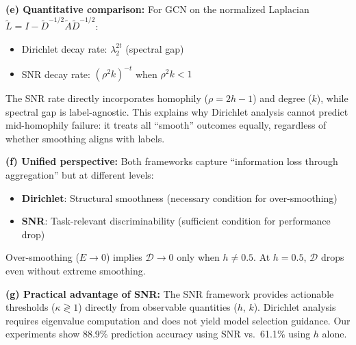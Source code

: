 \begin{remark}
\textbf{(e) Quantitative comparison:}
For GCN on the normalized Laplacian $\tilde{L} = I - \tilde{D}^{-1/2}\tilde{A}\tilde{D}^{-1/2}$:
\begin{itemize}
    \item Dirichlet decay rate: $\lambda_2^{2t}$ (spectral gap)
    \item SNR decay rate: $(\rho^2 k)^{-t}$ when $\rho^2 k < 1$
\end{itemize}
The SNR rate directly incorporates homophily ($\rho = 2h-1$) and degree ($k$), while spectral gap is label-agnostic. This explains why Dirichlet analysis cannot predict mid-homophily failure: it treats all ``smooth'' outcomes equally, regardless of whether smoothing aligns with labels.

\textbf{(f) Unified perspective:}
Both frameworks capture ``information loss through aggregation'' but at different levels:
\begin{itemize}
    \item \textbf{Dirichlet}: Structural smoothness (necessary condition for over-smoothing)
    \item \textbf{SNR}: Task-relevant discriminability (sufficient condition for performance drop)
\end{itemize}
Over-smoothing ($E \to 0$) implies $\mathcal{D} \to 0$ only when $h \neq 0.5$. At $h = 0.5$, $\mathcal{D}$ drops even without extreme smoothing.

\textbf{(g) Practical advantage of SNR:}
The SNR framework provides actionable thresholds ($\kappa \gtrless 1$) directly from observable quantities ($h$, $k$). Dirichlet analysis requires eigenvalue computation and does not yield model selection guidance. Our experiments show 88.9\% prediction accuracy using SNR vs.\ 61.1\% using $h$ alone.
\end{remark}


